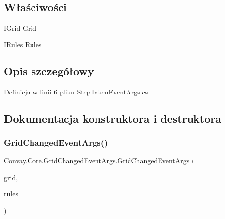 \subsection*{Właściwości}
\begin{DoxyCompactItemize}
\item 
\hyperlink{interface_convay_1_1_core_1_1_interfaces_1_1_i_grid}{I\+Grid} \hyperlink{class_convay_1_1_core_1_1_grid_changed_event_args_ac9ca2bcbf1c6ab31c34c2b5c93729e4b}{Grid}
\item 
\hyperlink{interface_convay_1_1_core_1_1_interfaces_1_1_i_rules}{I\+Rules} \hyperlink{class_convay_1_1_core_1_1_grid_changed_event_args_a83432f38359321c05d8a19d54be4bb7d}{Rules}
\end{DoxyCompactItemize}


\subsection{Opis szczegółowy}


Definicja w linii 6 pliku Step\+Taken\+Event\+Args.\+cs.



\subsection{Dokumentacja konstruktora i destruktora}
\hypertarget{class_convay_1_1_core_1_1_grid_changed_event_args_aac0e73356d65dff57090526ed694b024}{}\label{class_convay_1_1_core_1_1_grid_changed_event_args_aac0e73356d65dff57090526ed694b024} 
\subsubsection{\texorpdfstring{Grid\+Changed\+Event\+Args()}{GridChangedEventArgs()}}
{\footnotesize\ttfamily Convay.\+Core.\+Grid\+Changed\+Event\+Args.\+Grid\+Changed\+Event\+Args (\begin{DoxyParamCaption}\item[{\hyperlink{interface_convay_1_1_core_1_1_interfaces_1_1_i_grid}{I\+Grid}}]{grid,  }\item[{\hyperlink{interface_convay_1_1_core_1_1_interfaces_1_1_i_rules}{I\+Rules}}]{rules }\end{DoxyParamCaption})}




